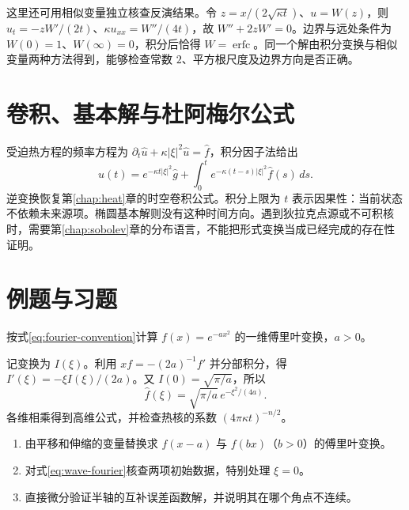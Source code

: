 \documentclass[UTF8,12pt,a4paper,fontset=fandol]{ctexbook}
\begin{document}
这里还可用相似变量独立核查反演结果。令 $z=x/(2\sqrt{\kappa t})$、$u=W(z)$，则 $u_t=-zW'/(2t)$、$\kappa u_{xx}=W''/(4t)$，故 $W''+2zW'=0$。边界与远处条件为 $W(0)=1$、$W(\infty)=0$，积分后恰得 $W=\operatorname{erfc}$。同一个解由积分变换与相似变量两种方法得到，能够检查常数 $2$、平方根尺度及边界方向是否正确。

\section{卷积、基本解与杜阿梅尔公式}
受迫热方程的频率方程为 $\partial_t\widehat u+\kappa|\xi|^2\widehat u=\widehat f$，积分因子法给出
\[
 \widehat u(t)=e^{-\kappa t|\xi|^2}\widehat g+
 \int_0^t e^{-\kappa(t-s)|\xi|^2}\widehat f(s)\,ds.
\]
逆变换恢复第\ref{chap:heat}章的时空卷积公式。积分上限为 $t$ 表示因果性：当前状态不依赖未来源项。椭圆基本解则没有这种时间方向。遇到狄拉克点源或不可积核时，需要第\ref{chap:sobolev}章的分布语言，不能把形式变换当成已经完成的存在性证明。

\section{例题与习题}
\begin{example}
按式\eqref{eq:fourier-convention}计算 $f(x)=e^{-a x^2}$ 的一维傅里叶变换，$a>0$。
\end{example}
\begin{solve}
记变换为 $I(\xi)$。利用 $xf=-(2a)^{-1}f'$ 并分部积分，得 $I'(\xi)=-\xi I(\xi)/(2a)$。又 $I(0)=\sqrt{\pi/a}$，所以
\[
 \widehat f(\xi)=\sqrt{\pi/a}\,e^{-\xi^2/(4a)}.
\]
各维相乘得到高维公式，并检查热核的系数 $(4\pi\kappa t)^{-n/2}$。
\end{solve}
\begin{enumerate}
 \item 由平移和伸缩的变量替换求 $f(x-a)$ 与 $f(bx)$（$b>0$）的傅里叶变换。
 \item 对式\eqref{eq:wave-fourier}核查两项初始数据，特别处理 $\xi=0$。
 \item 直接微分验证半轴的互补误差函数解，并说明其在哪个角点不连续。
\end{enumerate}
\end{document}
